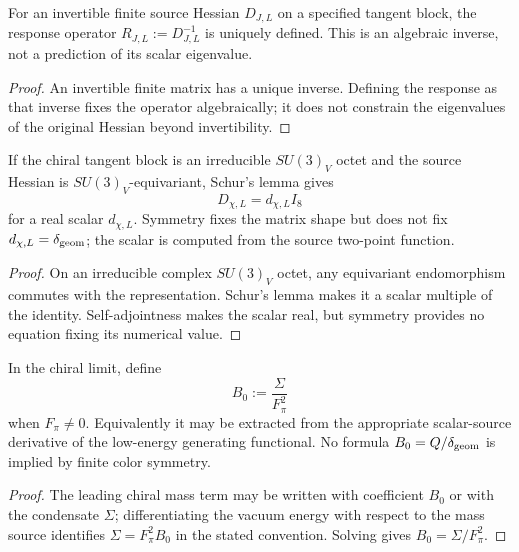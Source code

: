 \documentclass[12pt,a4paper]{article}
\providecommand{\deltageom}{\delta_{\rm geom}}
\begin{document}
\begin{lemma}
\label{p10:lem:primitive-source-response-duality}
For an invertible finite source Hessian \(D_{J,L}\) on a specified tangent block, the response operator \(R_{J,L}:=D_{J,L}^{-1}\) is uniquely defined.  This is an algebraic inverse, not a prediction of its scalar eigenvalue.
\end{lemma}
\begin{proof}
An invertible finite matrix has a unique inverse.  Defining the response as that inverse fixes the operator algebraically; it does not constrain the eigenvalues of the original Hessian beyond invertibility.
\end{proof}

\begin{lemma}
\label{p10:lem:inverse-defect-scalar-spurion-selector}
If the chiral tangent block is an irreducible \(SU(3)_V\) octet and the source Hessian is \(SU(3)_V\)-equivariant, Schur's lemma gives
\begin{equation}
D_{\chi,L}=d_{\chi,L}I_8
\end{equation}
for a real scalar \(d_{\chi,L}\).  Symmetry fixes the matrix shape but does not fix \(d_{\chi,L}=\deltageom\); the scalar is computed from the source two-point function.
\end{lemma}
\begin{proof}
On an irreducible complex $SU(3)_V$ octet, any equivariant endomorphism commutes with the representation.  Schur's lemma makes it a scalar multiple of the identity.  Self-adjointness makes the scalar real, but symmetry provides no equation fixing its numerical value.
\end{proof}

\begin{theorem}
\label{p10:thm:native-gmor-scalar-coefficient}
In the chiral limit, define
\begin{equation}
B_0:=\frac{\Sigma}{F_\pi^2}
\end{equation}
when \(F_\pi\ne0\).  Equivalently it may be extracted from the appropriate scalar-source derivative of the low-energy generating functional.  No formula \(B_0=Q/\deltageom\) is implied by finite color symmetry.
\end{theorem}
\begin{proof}
The leading chiral mass term may be written with coefficient $B_0$ or with the condensate $\Sigma$; differentiating the vacuum energy with respect to the mass source identifies $\Sigma=F_\pi^2B_0$ in the stated convention.  Solving gives $B_0=\Sigma/F_\pi^2$.
\end{proof}
\end{document}
